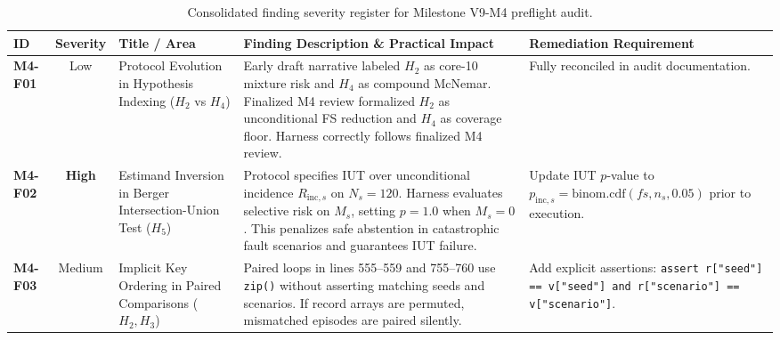 \documentclass[10pt,a4paper]{article}
\begin{document}
\begin{table}[h!]
\centering
\small
\begin{tabularx}{\textwidth}{p{1.2cm}cp{3.8cm}Xp{2.2cm}}
\toprule
\textbf{ID} & \textbf{Severity} & \textbf{Title / Area} & \textbf{Finding Description \& Practical Impact} & \textbf{Remediation Requirement} \\
\midrule
\textbf{M4-F01} & Low & Protocol Evolution in Hypothesis Indexing ($H_2$ vs $H_4$) & Early draft narrative labeled $H_2$ as core-10 mixture risk and $H_4$ as compound McNemar. Finalized M4 review formalized $H_2$ as unconditional FS reduction and $H_4$ as coverage floor. Harness correctly follows finalized M4 review. & Fully reconciled in audit documentation. \\
\addlinespace
\textbf{M4-F02} & \textbf{High} & Estimand Inversion in Berger Intersection-Union Test ($H_5$) & Protocol specifies IUT over unconditional incidence $R_{\mathrm{inc}, s}$ on $N_s=120$. Harness evaluates selective risk on $M_s$, setting $p=1.0$ when $M_s=0$. This penalizes safe abstention in catastrophic fault scenarios and guarantees IUT failure. & Update IUT $p$-value to $p_{\mathrm{inc}, s} = \mathrm{binom.cdf}(fs, n_s, 0.05)$ prior to execution. \\
\addlinespace
\textbf{M4-F03} & Medium & Implicit Key Ordering in Paired Comparisons ($H_2, H_3$) & Paired loops in lines 555--559 and 755--760 use \texttt{zip()} without asserting matching seeds and scenarios. If record arrays are permuted, mismatched episodes are paired silently. & Add explicit assertions: \texttt{assert r["seed"] == v["seed"] and r["scenario"] == v["scenario"]}. \\
\bottomrule
\end{tabularx}
\caption{Consolidated finding severity register for Milestone V9-M4 preflight audit.}
\label{tab:severity_register}
\end{table}
\end{document}
